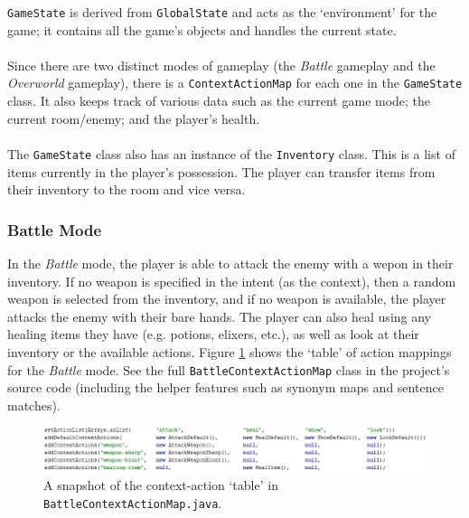 \documentclass[11pt]{article}
\begin{document}
\texttt{GameState} is derived from \texttt{GlobalState} and acts as the `environment' for the game; it contains all the game's objects and handles the current state.
\\
\\
Since there are two distinct modes of gameplay (the \textit{Battle} gameplay and the \textit{Overworld} gameplay), there is a \texttt{ContextActionMap} for each one in the \texttt{GameState} class. It also keeps track of various data such as the current game mode; the current room/enemy; and the player's health.
\\
\\
The \texttt{GameState} class also has an instance of the \texttt{Inventory} class. This is a list of items currently in the player's possession. The player can transfer items from their inventory to the room and vice versa.

\subsubsection{Battle Mode}

In the \textit{Battle} mode, the player is able to attack the enemy with a wepon in their inventory. If no weapon is specified in the intent (as the context), then a random weapon is selected from the inventory, and if no weapon is available, the player attacks the enemy with their bare hands. The player can also heal using any healing items they have (e.g. potions, elixers, etc.), as well as look at their inventory or the available actions. Figure \ref{fig:battle-context-action-map} shows the `table' of action mappings for the \textit{Battle} mode. See the full \texttt{BattleContextActionMap} class in the project's source code (including the helper features such as synonym maps and sentence matches).

\begin{center}
\begin{figure}[H]
\begin{center}
  \includegraphics[width=\linewidth]{battle-context-action-map.png}
  \caption{A snapshot of the context-action `table' in \texttt{BattleContextActionMap.java}.}
  \label{fig:battle-context-action-map}
  \end{center}
\end{figure}
\end{center}
\end{document}
